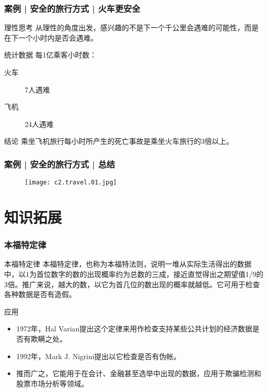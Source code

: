 \begin{frame}
  \frametitle{案例 | 安全的旅行方式 | 火车更安全}
  \begin{block}{理性思考}
    从理性的角度出发，感兴趣的不是下一个千公里会遇难的可能性，而是在下一个小时内是否会遇难。
  \end{block}
  \pause
  \begin{block}{统计数据}
    每1亿乘客小时数：
    \begin{description}
      \item[火车] 7人遇难
      \item[飞机] 24人遇难
    \end{description}
  \end{block}
  \pause
  \begin{block}{结论}
    乘坐飞机旅行每小时所产生的死亡事故是乘坐火车旅行的3倍以上。
  \end{block}
\end{frame}

\begin{frame}
  \frametitle{案例 | 安全的旅行方式 | 总结}
  \begin{figure}
    \centering
    \texttt{[image: c2.travel.01.jpg]}
  \end{figure}
\end{frame}

\section{知识拓展}
\begin{frame}
  \frametitle{本福特定律}
  \begin{block}{本福特定律}
本福特定律，也称为本福特法则，说明一堆从实际生活得出的数据中，以1为首位数字的数的出现概率约为总数的三成，接近直觉得出之期望值1/9的3倍。推广来说，越大的数，以它为首几位的数出现的概率就越低。它可用于检查各种数据是否有造假。
  \end{block}
  \pause
  \begin{block}{应用}
    \begin{itemize}
      \item 1972年，Hal Varian提出这个定律来用作检查支持某些公共计划的经济数据是否有欺瞒之处。
      \item 1992年，Mark J. Nigrini提出以它检查是否有伪帐。
      \item 推而广之，它能用于在会计、金融甚至选举中出现的数据，应用于欺骗检测和股票市场分析等领域。
    \end{itemize}
  \end{block}
\end{frame}

